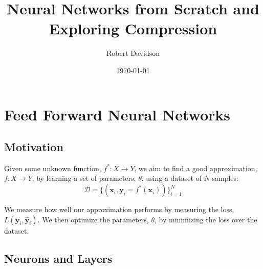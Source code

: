 \documentclass[10pt,a4paper]{article}
\title{Neural Networks from Scratch and Exploring Compression}
\author{Robert Davidson}
\date{\today}
\begin{document}
\maketitle

\section{Feed Forward Neural Networks}

\subsection{Motivation}
Given some unknown function, $f^\ast: X \to Y$, we aim to find a good
approximation, $f: X \to Y$, by learning a set of parameters, $\theta$,
using a dataset of $N$ samples:
$$
\mathcal{D} = \{(\mathbf{x}_i, \mathbf{y}_i = f^\ast(\mathbf{x}_i))\}_{i=1}^N
$$

\noindent We measure how well our approximation performs by measuring the loss,
$L(\mathbf{y}_i, \hat{\mathbf{y}}_i)$. We then optimize the parameters, $\theta$, by
minimizing the loss over the dataset.\cite{goodfellow2016deep}\cite{smets2024mathematics}

\subsection{Neurons and Layers}
\end{document}
